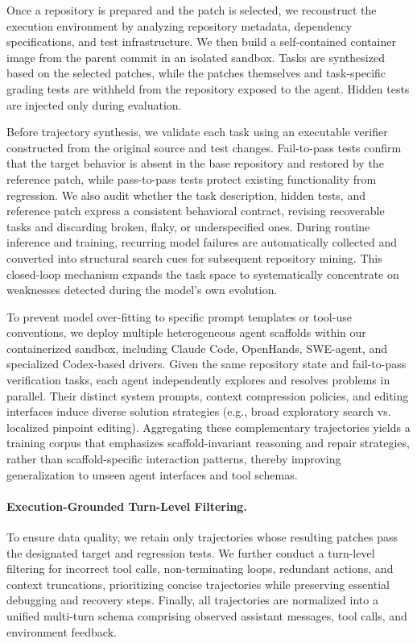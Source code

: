 Once a repository is prepared and the patch is selected, we reconstruct the execution environment by analyzing repository metadata, dependency specifications, and test infrastructure. We then build a self-contained container image from the parent commit in an isolated sandbox.
Tasks are synthesized based on the selected patches, while the patches themselves and task-specific grading tests are withheld from the repository exposed to the agent.
Hidden tests are injected only during evaluation.


Before trajectory synthesis, we validate each task using an executable verifier constructed from the original source and test changes. 
Fail-to-pass tests confirm that the target behavior is absent in the base repository and restored by the reference patch, while pass-to-pass tests protect existing functionality from regression. 
We also audit whether the task description, hidden tests, and reference patch express a consistent behavioral contract, revising recoverable tasks and discarding broken, flaky, or underspecified ones. 
During routine inference and training, recurring model failures are automatically collected and converted into structural search cues for subsequent repository mining. 
This closed-loop mechanism expands the task space to systematically concentrate on weaknesses detected during the model’s own evolution.



To prevent model over-fitting to specific prompt templates or tool-use conventions, we deploy multiple heterogeneous agent scaffolds within our containerized sandbox, including Claude Code, OpenHands, SWE-agent, and specialized Codex-based drivers.
Given the same repository state and fail-to-pass verification tasks, each agent independently explores and resolves problems in parallel. 
Their distinct system prompts, context compression policies, and editing interfaces induce diverse solution strategies (e.g., broad exploratory search vs. localized pinpoint editing). 
Aggregating these complementary trajectories yields a training corpus that emphasizes scaffold-invariant reasoning and repair strategies, rather than scaffold-specific interaction patterns, thereby improving generalization to unseen agent interfaces and tool schemas.


\paragraph{Execution-Grounded Turn-Level Filtering.}
To ensure data quality, we retain only trajectories whose resulting patches pass the designated target and regression tests. 
We further conduct a turn-level filtering for incorrect tool calls, non-terminating loops, redundant actions, and context truncations, prioritizing concise trajectories while preserving essential debugging and recovery steps. 
Finally, all trajectories are normalized into a unified multi-turn schema comprising observed assistant messages, tool calls, and environment feedback.



